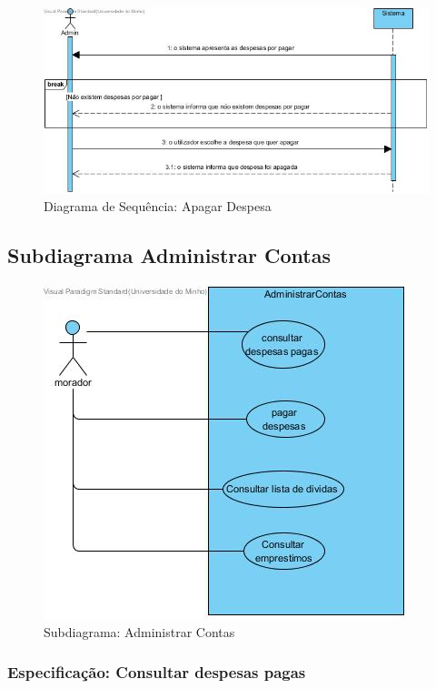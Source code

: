\begin{figure}[htb!]
	\centering
	\includegraphics[scale=0.5]{imagens/diagramaSeq/ApagarDespesa}  
	\caption{Diagrama de Sequência: Apagar Despesa}  
\end{figure}

\newpage
\subsection{Subdiagrama Administrar Contas}
\begin{figure}[htb!]
	\centering
	\includegraphics[scale=0.6]{imagens/UseCase/despesasMorador}  
	\caption{Subdiagrama: Administrar Contas }  
\end{figure}


\newpage

\subsubsection{Especificação: Consultar despesas pagas }

